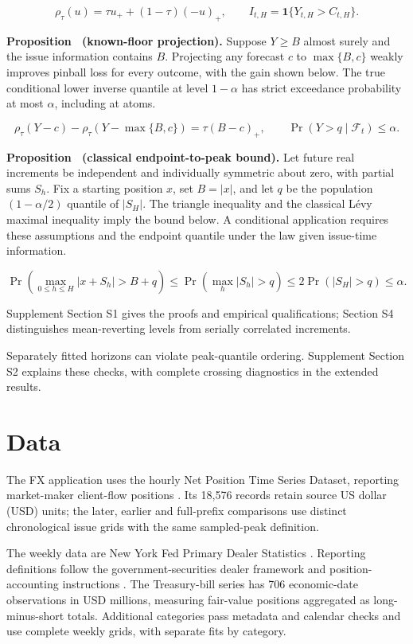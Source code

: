 \documentclass[12pt,a4paper]{article}
\newcounter{proposition}
\begin{document}
\[
\rho_\tau(u)=\tau u_+ +(1-\tau)(-u)_+,\qquad I_{t,H}=\mathbf 1\{Y_{t,H}>C_{t,H}\}.
\]

\noindent\textbf{Proposition~\theproposition{} (known-floor projection).}\label{prop:floor} Suppose \(Y\ge B\) almost surely and the issue information contains \(B\). Projecting any forecast \(c\) to \(\max\{B,c\}\) weakly improves pinball loss for every outcome, with the gain shown below. The true conditional lower inverse quantile at level \(1-\alpha\) has strict exceedance probability at most \(\alpha\), including at atoms.


\[
\rho_\tau(Y-c)-\rho_\tau(Y-\max\{B,c\})=\tau(B-c)_+,\qquad \Pr(Y>q\mid\mathcal F_t)\le\alpha.
\]

\noindent\textbf{Proposition~\theproposition{} (classical endpoint-to-peak bound).}\label{prop:levy} Let future real increments be independent and individually symmetric about zero, with partial sums \(S_h\). Fix a starting position \(x\), set \(B=|x|\), and let \(q\) be the population \((1-\alpha/2)\) quantile of \(|S_H|\). The triangle inequality and the classical L\'evy maximal inequality imply the bound below. A conditional application requires these assumptions and the endpoint quantile under the law given issue-time information.


\[
\Pr\!\left(\max_{0\le h\le H}|x+S_h|>B+q\right)\le\Pr\!\left(\max_h|S_h|>q\right)\le2\Pr(|S_H|>q)\le\alpha.
\]

Supplement Section S1 gives the proofs and empirical qualifications; Section S4 distinguishes mean-reverting levels from serially correlated increments.


Separately fitted horizons can violate peak-quantile ordering. Supplement Section S2 explains these checks, with complete crossing diagnostics in the extended results.


\FloatBarrier

\section{Data}\label{sec:data}

The FX application uses the hourly Net Position Time Series Dataset, reporting market-maker client-flow positions \cite{dataset,wisniewski2020}. Its 18,576 records retain source US dollar (USD) units; the later, earlier and full-prefix comparisons use distinct chronological issue grids with the same sampled-peak definition.

The weekly data are New York Fed Primary Dealer Statistics \cite{nyfeddata}. Reporting definitions follow the government-securities dealer framework and position-accounting instructions \cite{fr2004_2013,fr2004_2024}. The Treasury-bill series has 706 economic-date observations in USD millions, measuring fair-value positions aggregated as long-minus-short totals. Additional categories pass metadata and calendar checks and use complete weekly grids, with separate fits by category.
\end{document}
